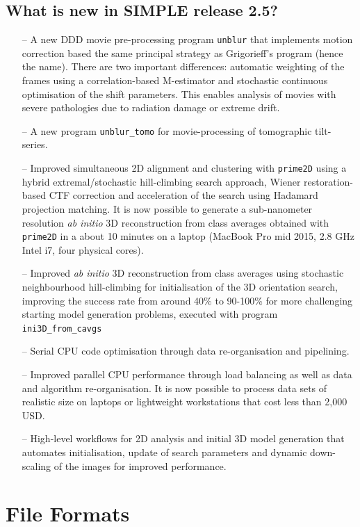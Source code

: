 \documentclass[a4paper,11pt]{article}
\newcommand{\prgname}[1]{\textcolor{NavyBlue}{\texttt{#1}}}
\begin{document}
\subsection{What is new in SIMPLE release 2.5?}
\begin{itemize}
    \item[--] A new DDD movie pre-processing program \prgname{unblur} that implements motion correction based the same principal strategy as Grigorieff's program (hence the name). There are two important differences: automatic weighting of the frames using a correlation-based M-estimator and stochastic continuous optimisation of the shift parameters. This enables analysis of movies with severe pathologies due to radiation damage or extreme drift.
    \item[--] A new program \prgname{unblur\_tomo} for movie-processing of tomographic tilt-series.
    \item[--] Improved simultaneous 2D alignment and clustering with \prgname{prime2D} using a hybrid extremal/stochastic hill-climbing search approach, Wiener restoration-based CTF correction and acceleration of the search using Hadamard projection matching. It is now possible to generate a sub-nanometer resolution \textit{ab initio} 3D reconstruction from class averages obtained with  \prgname{prime2D} in a about 10 minutes on a laptop (MacBook Pro mid 2015, 2.8 GHz Intel i7, four physical cores).
    \item[--] Improved \textit{ab initio} 3D reconstruction from class averages using stochastic neighbourhood hill-climbing for initialisation of the 3D orientation search, improving the success rate from around 40\% to 90-100\% for more challenging starting model generation problems, executed with program \prgname{ini3D\_from\_cavgs}
    \item[--] Serial CPU code optimisation through data re-organisation and pipelining.
    \item[--] Improved parallel CPU performance through load balancing as well as data and algorithm re-organisation. It is now possible to process data sets of realistic size on laptops or lightweight workstations that cost less than 2,000 USD.
    \item[--] High-level workflows for 2D analysis and initial 3D model generation that automates initialisation, update of search parameters and dynamic down-scaling of the images for improved performance.
\end{itemize}

\section{File Formats}
\end{document}
